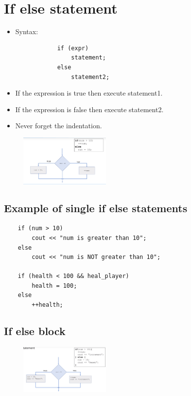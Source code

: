 \section{If else statement}
\begin{itemize}
    \item Syntax:
        \begin{verbatim}
            if (expr)
                statement;
            else
                statement2;
        \end{verbatim}
    \item If the expression is true then execute statement1.
    \item If the expression is false then execute statement2.
    \item Never forget the indentation.
\end{itemize}
\begin{figure}[H]
    \centering
    \includegraphics[width=0.4\textwidth]{./figs/ifelse}
\end{figure}

\subsection{Example of single if else statements}
\begin{verbatim}
    if (num > 10)
        cout << "num is greater than 10";
    else 
        cout << "num is NOT greater than 10";
    
    if (health < 100 && heal_player) 
        health = 100;
    else 
        ++health;
\end{verbatim}


\subsection{If else block}
\begin{figure}[H]
    \centering
    \includegraphics[width=0.4\textwidth]{./figs/multiifelse.png}
\end{figure}


